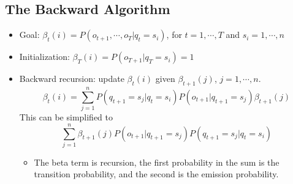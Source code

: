 \documentclass[10pt]{article}
\begin{document}
\subsection*{The Backward Algorithm}
\begin{itemize}
	\item Goal: $\beta_t(i) = P(o_{t + 1}, \cdots, o_T | q_t = s_i)$, for $t = 1, \cdots, T$ and $s_i = 1, \cdots, n$
	\item Initialization: $\beta_T(i) = P(o_{T + 1} | q_T = s_i) = 1$
	\item Backward recursion: update $\beta_t(i)$ given $\beta_{t + 1}(j)$, $j = 1, \cdots, n$.
	\[\beta_t(i) = \sum_{j = 1}^n P(q_{t + 1} = s_j | q_t = s_i) P(o_{t + 1} | q_{t + 1} = s_j) \beta_{t + 1}(j)\]
    This can be simplified to
    \[\sum_{j = 1}^n \beta_{t + 1}(j) P(o_{t + 1} | q_{t + 1} = s_j) P(q_{t + 1} = s_j | q_t = s_i)\]
    \begin{itemize}
	    \item The beta term is recursion, the first probability in the sum is the transition probability, and the second is the emission probability.
    \end{itemize}
\end{itemize}
\end{document}
